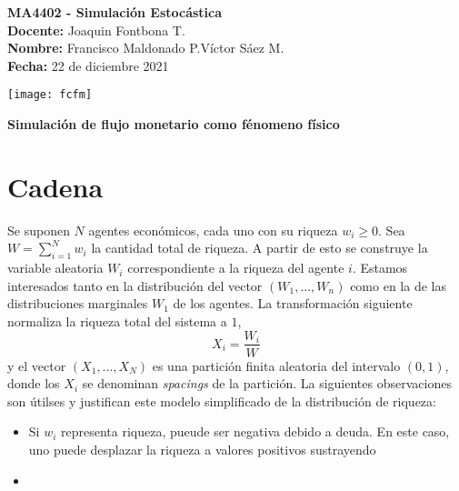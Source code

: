 \documentclass[10pt]{article}
\theoremstyle{plain}
\theoremstyle{definition}
\newcommand{\ramo}{MA4402 - Simulación Estocástica} %
\newcommand{\profe}{Joaquin Fontbona T.}%
\newcommand{\nmbrA}{Francisco Maldonado P.}%
\newcommand{\nmbrB}{Víctor Sáez M.}    %
\newcommand{\nmbrC}{}    %
\newcommand{\fecha}{22 de diciembre 2021}%
\newcommand{\titu}{Simulación de flujo monetario como fénomeno físico } %
\begin{document}
\pagestyle{empty}
\vspace*{-1.2 cm}
\begin{minipage}{0.6\textwidth}
\begin{flushleft}
\hspace*{-0.5cm}\textbf{\ramo}\\
\hspace*{-0.5cm}\textbf{Docente:} \profe\\
\hspace*{-0.5cm}\textbf{Nombre:} \nmbrA\quad \nmbrB\quad \nmbrC
\\
\hspace*{-0.5cm}\textbf{Fecha:} \fecha\\
\smallskip
\end{flushleft}
\end{minipage}
\begin{minipage}{0.36\textwidth}
\begin{flushright}
\texttt{[image: fcfm]}
\end{flushright}
\end{minipage}
\bigskip

\begin{center}
\Huge\textbf{\titu}
\end{center}
\bigskip

\section{Cadena}

Se suponen $N$ agentes económicos, cada uno con su riqueza $w_{i}\geq 0 $. Sea $W = \sum\limits_{i=1}^{N} w_{i}$ la  cantidad total de riqueza. 
A partir de esto se construye la variable aleatoria $W_{i}$ correspondiente a la riqueza del agente $i$. Estamos interesados tanto en la distribución del vector $(W_{1},...,W_{n})$ como en la de las distribuciones marginales $W_{1}$ de los agentes.
La transformación siguiente normaliza la riqueza total del sistema a $1$, \[
X_{i}=\frac{W_{i}}{W}
\]
y el vector $(X_{1},...,X_{N})$ es una partición finita aleatoria del intervalo $(0,1)$, donde los  $X_{i}$ se denominan {\sl spacings} de la partición.
La siguientes observaciones son útilses y justifican este modelo simplificado de la distribución de riqueza:
\begin{itemize}
    \item Si $w_{i}$ representa riqueza, pueude ser negativa debido a deuda. En este caso, uno puede desplazar la riqueza a valores positivos sustrayendo 
    \item
\end{itemize}
\end{document}
